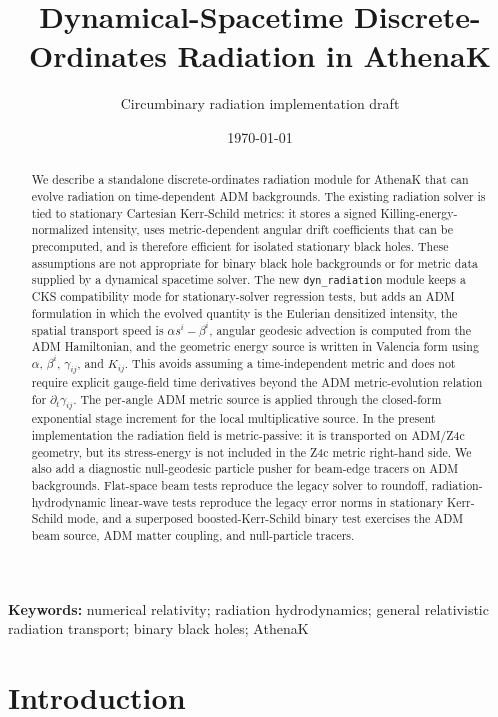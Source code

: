 \documentclass[11pt]{article}
\title{\bfseries Dynamical-Spacetime Discrete-Ordinates Radiation in AthenaK}
\author{Circumbinary radiation implementation draft}
\date{\today}
\newcommand{\code}[1]{\texttt{#1}}
\begin{document}
\maketitle

\begin{abstract}
We describe a standalone discrete-ordinates radiation module for AthenaK that
can evolve radiation on time-dependent ADM backgrounds.  The existing radiation
solver is tied to stationary Cartesian Kerr-Schild metrics: it stores a signed
Killing-energy-normalized intensity, uses metric-dependent angular drift
coefficients that can be precomputed, and is therefore efficient for isolated
stationary black holes.  These assumptions are not appropriate for binary black
hole backgrounds or for metric data supplied by a dynamical spacetime solver.
The new \code{dyn\_radiation} module keeps a CKS compatibility mode for
stationary-solver regression tests, but adds an ADM formulation in which the evolved
quantity is the Eulerian densitized intensity, the spatial transport speed is
\(\alpha s^i-\beta^i\), angular geodesic advection is computed from the ADM
Hamiltonian, and the geometric energy source is written in Valencia form using
\(\alpha\), \(\beta^i\), \(\gamma_{ij}\), and \(K_{ij}\).  This avoids assuming a
time-independent metric and does not require explicit gauge-field time
derivatives beyond the ADM metric-evolution relation for
\(\partial_t\gamma_{ij}\).  The per-angle ADM metric source is applied through
the closed-form exponential stage increment for the local multiplicative
source.  In the present implementation the radiation field is metric-passive:
it is transported on ADM/Z4c geometry, but its stress-energy is not included in
the Z4c metric right-hand side.  We also add a diagnostic null-geodesic
particle pusher for beam-edge tracers on ADM backgrounds.  Flat-space beam tests
reproduce the legacy solver to roundoff, radiation-hydrodynamic linear-wave
tests reproduce the legacy error norms in stationary Kerr-Schild mode, and a
superposed boosted-Kerr-Schild binary test exercises the ADM beam source, ADM
matter coupling, and null-particle tracers.
\end{abstract}

\noindent\textbf{Keywords:} numerical relativity; radiation hydrodynamics;
general relativistic radiation transport; binary black holes; AthenaK

\section{Introduction}
\label{sec:introduction}
\end{document}
